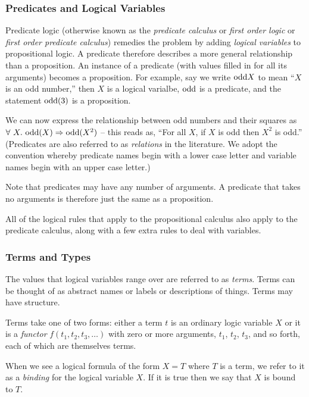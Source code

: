 \subsubsection{Predicates and Logical Variables}

Predicate logic (otherwise known as the \emph{predicate calculus} or
\emph{first order logic} or \emph{first order predicate calculus})
remedies the problem by adding \emph{logical variables} to propositional
logic.  A predicate therefore describes a more general relationship than
a proposition.  An instance of a predicate (\ie with values filled in
for all its arguments) becomes a proposition.  For example, say we write
$\text{odd}{X}$ to mean ``$X$ is an odd number,'' then $X$ is a logical
varialbe, $\text{odd}$ is a predicate, and the statement $\text{odd}(3)$ is a
proposition.

We can now express the relationship between odd numbers and their
squares as
$\forall\ X.\ \text{odd}(X) \Rightarrow \text{odd}(X^2)$ -- this reads as, ``For all $X$, if
$X$ is odd then $X^2$ is odd.''
(Predicates are also referred to as \emph{relations} in the literature.
We adopt the convention whereby predicate names begin with a lower case
letter and variable names begin with an upper case letter.)

Note that predicates may have any number of arguments.  A predicate that
takes no arguments is therefore just the same as a proposition.

All of the logical rules that apply to the propositional calculus also
apply to the predicate calculus, along with a few extra rules to deal
with variables.

\subsubsection{Terms and Types}

The values that logical variables range over are referred to as
\emph{terms}.  Terms can be thought of as abstract names or labels or
descriptions of things.  Terms may have structure.

Terms take one of two forms: either a term $t$ is an ordinary logic
variable $X$ or it is a \emph{functor} $f(t_1, t_2, t_3, \ldots)$
with zero or more arguments, $t_1$, $t_2$, $t_3$, and so forth, each of
which are themselves terms.

When we see a logical formula of the form $X = T$ where $T$ is a term,
we refer to it as a \emph{binding} for the logical variable $X$.  If it
is true then we say that $X$ is bound to $T$.

